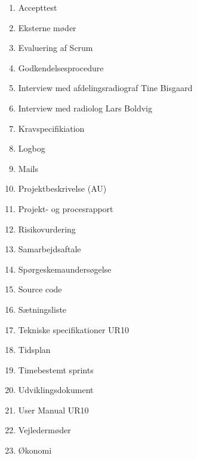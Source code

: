 \begin{enumerate}
\item Accepttest 					 		\label{Accepttest}
\item Eksterne møder						\label{Eksterne moder} 
\item Evaluering af Scrum 						\label{Evaluering Scrum} 
\item Godkendelsesprocedure 					\label{Godkendelsesprocedure}
\item Interview med afdelingsradiograf Tine Bisgaard 	\label{Tine}
\item Interview med radiolog Lars Boldvig  			\label{Telefoninterview}
\item Kravspecifikiation 						\label{Kravspecifikation}
\item Logbog								\label{Logbog}
\item Mails								\label{Mails}
\item Projektbeskrivelse (AU) 					\label{Projektbeskrivelse}
\item Projekt- og procesrapport 					
\item Risikovurdering 						\label{Risikovurdering} 
\item Samarbejdsaftale						\label{Samarbejdesaftale} 
\item Spørgeskemaundersøgelse 					\label{Sporgeskemaundersogelse}
\item Source code 							\label{Source code} 
\item Sætningsliste 							\label{Satningsliste}
\item Tekniske specifikationer UR10				\label{UR10spec}
\item Tidsplan							\label{Tidsplan}
\item Timebestemt sprints 						\label{Timebestemt sprints}
\item Udviklingsdokument 						\label{Udviklingsdokument}
\item User Manual UR10 						\label{UserManualUR10}
\item Vejledermøder						\label{Vejledermoder}
\item Økonomi 							\label{Okonomi}

\end{enumerate}


